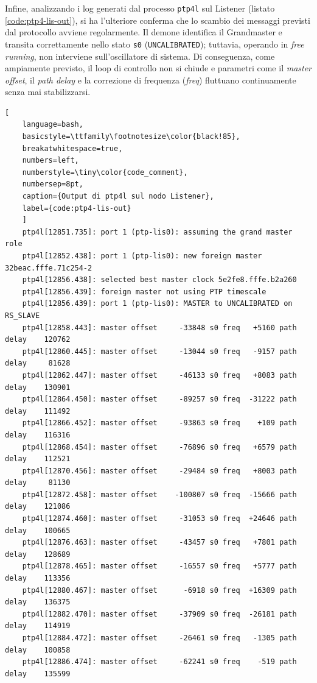 \documentclass[12pt,a4paper,twoside]{book}
\begin{document}
\begin{onehalfspace}
Infine, analizzando i log generati dal processo \texttt{ptp4l} sul Listener (listato \ref{code:ptp4-lis-out}), si ha l'ulteriore conferma che lo scambio dei messaggi previsti dal protocollo avviene regolarmente. Il demone identifica il Grandmaster e transita correttamente nello stato \texttt{s0} (\texttt{UNCALIBRATED}); tuttavia, operando in \textit{free running}, non interviene sull'oscillatore di sistema. Di conseguenza, come ampiamente previsto, il loop di controllo non si chiude e parametri come il \textit{master offset}, il \textit{path delay} e la correzione di frequenza (\textit{freq}) fluttuano continuamente senza mai stabilizzarsi.

\begin{lstlisting}[
    language=bash,
    basicstyle=\ttfamily\footnotesize\color{black!85},
    breakatwhitespace=true,
    numbers=left,
    numberstyle=\tiny\color{code_comment},
    numbersep=8pt,
    caption={Output di ptp4l sul nodo Listener},
    label={code:ptp4-lis-out}
    ]
    ptp4l[12851.735]: port 1 (ptp-lis0): assuming the grand master role
    ptp4l[12852.438]: port 1 (ptp-lis0): new foreign master 32beac.fffe.71c254-2
    ptp4l[12856.438]: selected best master clock 5e2fe8.fffe.b2a260
    ptp4l[12856.439]: foreign master not using PTP timescale
    ptp4l[12856.439]: port 1 (ptp-lis0): MASTER to UNCALIBRATED on RS_SLAVE
    ptp4l[12858.443]: master offset     -33848 s0 freq   +5160 path delay    120762
    ptp4l[12860.445]: master offset     -13044 s0 freq   -9157 path delay     81628
    ptp4l[12862.447]: master offset     -46133 s0 freq   +8083 path delay    130901
    ptp4l[12864.450]: master offset     -89257 s0 freq  -31222 path delay    111492
    ptp4l[12866.452]: master offset     -93863 s0 freq    +109 path delay    116316
    ptp4l[12868.454]: master offset     -76896 s0 freq   +6579 path delay    112521
    ptp4l[12870.456]: master offset     -29484 s0 freq   +8003 path delay     81130
    ptp4l[12872.458]: master offset    -100807 s0 freq  -15666 path delay    121086
    ptp4l[12874.460]: master offset     -31053 s0 freq  +24646 path delay    100665
    ptp4l[12876.463]: master offset     -43457 s0 freq   +7801 path delay    128689
    ptp4l[12878.465]: master offset     -16557 s0 freq   +5777 path delay    113356
    ptp4l[12880.467]: master offset      -6918 s0 freq  +16309 path delay    136375
    ptp4l[12882.470]: master offset     -37909 s0 freq  -26181 path delay    114919
    ptp4l[12884.472]: master offset     -26461 s0 freq   -1305 path delay    100858
    ptp4l[12886.474]: master offset     -62241 s0 freq    -519 path delay    135599
\end{lstlisting}

\end{onehalfspace}
\end{document}
